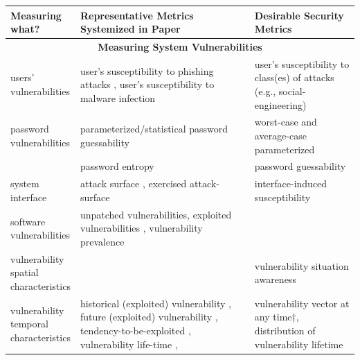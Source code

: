 \begin{tiny}
 \begin{longtable}{@{}|p{0.2\linewidth}|p{0.5\linewidth}|p{0.3\linewidth}|@{}}
\toprule
Measuring what? & Representative Metrics Systemized in Paper & Desirable Security Metrics \\* \midrule
\endhead
%
 \multicolumn{3}{c}{\textbf{Measuring System Vulnerabilities}} \\* \midrule
users’ vulnerabilities & user’s susceptibility to phishing attacks \cite{Sheng_Holbrook_Kumaraguru_Cranor_Downs_2010}, user’s susceptibility to malware infection \cite{levesque2013a} & user’s susceptibility to class(es) of attacks (e.g., social-engineering) \\
password vulnerabilities & parameterized/statistical password guessability  \cite{Weir_Aggarwal_Collins_Stern_2010, Bonneau_2012a, Kelley_Komanduri_Mazurek_Shay_Vidas_Bauer_Christin_Cranor_Lopez, Ur_Segreti_Bauer_Christin_Cranor_Komanduri_Kurilova_Mazurek_Melicher_Shay} & worst-case and average-case parameterized\cite{Bonneau_2012b} \\
 &   password entropy\cite{Burr_Dodson_Polk_2006} & password guessability \\
system interface & attack surface \cite{Manadhata_Wing_2010}, exercised attack-surface\cite{Nayak_Marino_Efstathopoulos_Dumitras_2014} & interface-induced susceptibility \\
software vulnerabilities & unpatched vulnerabilities\cite{Chew_Swanson_Stine_Bartol_Brown_Robinson_2008}, exploited vulnerabilities \cite{Nayak_Marino_Efstathopoulos_Dumitras_2014}, vulnerability prevalence \cite{Zhang_Durumeric_Bailey_Liu_Karir_2014} &  \\
vulnerability spatial characteristics &  & vulnerability situation awareness \\
vulnerability temporal characteristics & historical (exploited) vulnerability\cite{Al-Shaer_Khan_Ahmed_2008, Ahmed_Al-Shaer_Khan_2008} , future (exploited) vulnerability \cite{Al-Shaer_Khan_Ahmed_2008, Ahmed_Al-Shaer_Khan_2008}, tendency-to-be-exploited \cite{Sabottke_Suciu_Dumitras}, vulnerability life-time \cite{Frei_Feb_2010, Nappa_Johnson_Bilge_Caballero_Dumitras_2015, Yilek_Rescorla_Shacham_Enright_Savage_2009, durumeric2014a, Zhang_Durumeric_Bailey_Liu_Karir_2014}, & vulnerability vector at any time†, distribution of vulnerability lifetime \\

\end{longtable}
\end{tiny}
